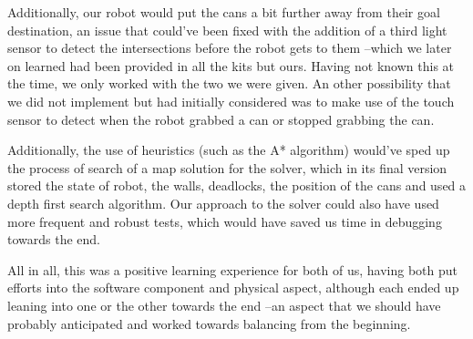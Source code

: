 \documentclass[a4paper,12pt]{article}
\begin{document}
Additionally, our robot would put the cans a bit further away from their goal destination, an issue that could've been fixed with the addition of a third light sensor to detect the intersections before the robot gets to them --which we later on learned had been provided in all the kits but ours. Having not known this at the time, we only worked with the two we were given. An other possibility that we did not implement but had initially considered was to make use of the touch sensor to detect when the robot grabbed a can or stopped grabbing the can.

Additionally, the use of heuristics (such as the A* algorithm) would've sped up the process of search of a map solution for the solver, which in its final version stored the state of robot, the walls, deadlocks, the position of the cans and used a depth first search algorithm. Our approach to the solver could also have used more frequent and robust tests, which would have saved us time in debugging towards the end.

All in all, this was a positive learning experience for both of us, having both put efforts into the software component and physical aspect, although each ended up leaning into one or the other towards the end --an aspect that we should have probably anticipated and worked towards balancing from the beginning.
\end{document}
